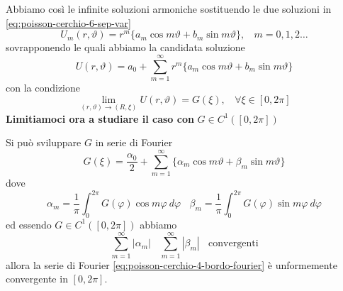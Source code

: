 \documentclass[10pt,a4paper,twoside,openright]{book}
\begin{document}
\begin{dimostrazione}
Abbiamo così le infinite soluzioni armoniche sostituendo le due soluzioni in \eqref{eq:poisson-cerchio-6-sep-var}
\begin{equation*}
U_{m}(r,\vartheta) =r^{m}\{a_{m}\cos m\vartheta +b_{m}\sin m\vartheta \},\ \ \ \ m=0,1,2\dotsc 
\end{equation*}
sovrapponendo le quali abbiamo la candidata soluzione
\begin{equation}
U(r,\vartheta) =a_{0} +\sum\limits ^{\infty }_{m=1} r^{m}\{a_{m}\cos m\vartheta +b_{m}\sin m\vartheta \}
\label{eq:poisson-cerchio-3-candidata}
\end{equation}
con la condizione
\begin{equation}
\lim _{(r,\vartheta)\rightarrow (R,\xi)} U(r,\vartheta) =G(\xi),\ \ \ \ \forall \xi \in [ 0,2\pi ]
\label{eq:poisson-cerchio-2-condizione}
\end{equation}
\textbf{Limitiamoci ora a studiare il caso con }$G\in C^{1}([ 0,2\pi ])$

Si può sviluppare $G$ in serie di Fourier
\begin{equation}
G(\xi) =\frac{\alpha _{0}}{2} +\sum\limits ^{\infty }_{m=1}\{\alpha _{m}\cos m\vartheta +\beta _{m}\sin m\vartheta \} \tag{F}
\label{eq:poisson-cerchio-4-bordo-fourier}
\end{equation}
dove
\begin{equation*}
\alpha _{m} =\frac{1}{\pi }\int ^{2\pi }_{0} G(\varphi)\cos m\varphi \ d\varphi \ \ \ \ \beta _{m} =\frac{1}{\pi }\int ^{2\pi }_{0} G(\varphi)\sin m\varphi \ d\varphi 
\end{equation*}
ed essendo $G\in C^{1}([ 0,2\pi ])$ abbiamo
\begin{equation*}
\sum\limits ^{\infty }_{m=1}| \alpha _{m}| \ \ \ \ \sum\limits ^{\infty }_{m=1}| \beta _{m}| \ \ \ \ \text{convergenti}
\end{equation*}
allora la serie di Fourier \eqref{eq:poisson-cerchio-4-bordo-fourier} è unformemente convergente in $[ 0,2\pi ]$.


\end{dimostrazione}
\end{document}
